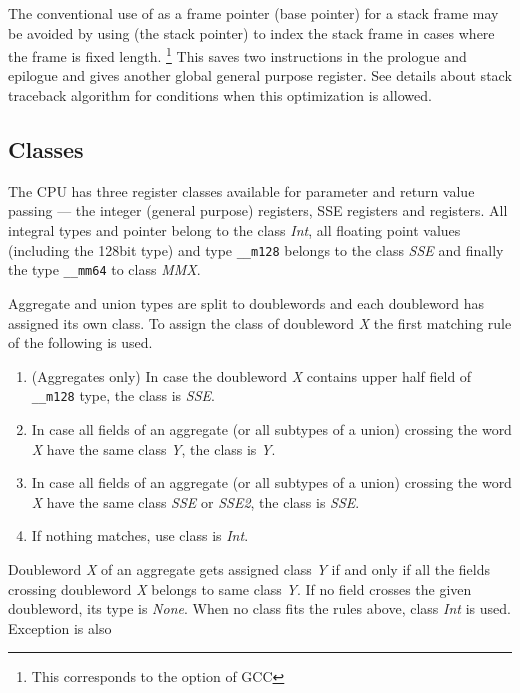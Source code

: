 The conventional use of \RBP{} as a frame pointer (base pointer) for a stack
frame may be avoided by using \RSP{} (the stack pointer) to index the
stack frame in cases where the frame is fixed length.%
\footnote{This corresponds to the  option of GCC}
This saves two instructions in the prologue and epilogue and
gives another global general purpose register.  See details about
stack traceback algorithm for conditions when this optimization is
allowed.  

\subsection{Classes}

The \xARCH CPU has three register classes available for parameter and
return value passing --- the integer (general purpose) registers, SSE
registers and \MMX{} registers.  All integral types and pointer belong
to the class \emph{Int}, all floating point values (including the
128bit type) and type \verb|__m128| belongs to the class \emph{SSE}
and finally the type \verb|__mm64| to class \emph{MMX}.

Aggregate and union types are split to doublewords and each doubleword has
assigned its own class. To assign the class of doubleword \emph{X} the
first matching rule of the following is used.
\begin{enumerate}
  \item (Aggregates only) In case the doubleword \emph{X} contains upper half field of
    \verb|__m128| type, the class is \emph{SSE}.
    
  \item In case all fields of an aggregate (or all subtypes of a
    union) crossing the word \emph{X} have the same class \emph{Y},
    the class is \emph{Y}.
    
  \item In case all fields of an aggregate (or all subtypes of a
    union) crossing the word \emph{X} have the same class \emph{SSE}
    or \emph{SSE2}, the class is \emph{SSE}.

  \item If nothing matches, use class is \emph{Int}.
\end{enumerate}

Doubleword \emph{X} of an aggregate gets assigned class \emph{Y} if and only
if all the fields crossing doubleword \emph{X} belongs to same class \emph{Y}.  If
no field crosses the given doubleword, its type is \emph{None}. When no class fits
the rules above, class \emph{Int} is used.  Exception is also 

